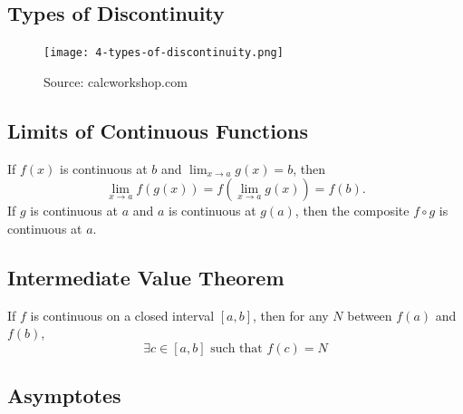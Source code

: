 \documentclass[a4paper,11pt]{article}
\begin{document}


\subsection{Types of Discontinuity}

\begin{figure}[htbp]
    \centering
    \texttt{[image: 4-types-of-discontinuity.png]} 
    \caption{Source: calcworkshop.com}
    \label{fig:discontinuity}
\end{figure}




\subsection{Limits of Continuous Functions}

\begin{tcolorbox}
    If $f(x)$ is continuous at $b$ and $\lim_{x \to a} g(x) = b$,  then
    \[
    \lim_{x \to a} f(g(x)) = f( \lim_{x \to a} g(x) ) = f(b).
    \]
    \tcblower
    If $g$ is continuous at $a$ and $a$ is continuous at $g(a)$, then the composite $f \circ g$ is continuous at $a$.
\end{tcolorbox}




\subsection{Intermediate Value Theorem}

\begin{tcolorbox}
    If $f$ is continuous on a closed interval $[a, b]$, then for any $N$ between $f(a)$ and $f(b)$,  
    \[
    \exists c \in [a,b] \text{ such that } f(c) = N
    \]
\end{tcolorbox}




\subsection{Asymptotes}
\end{document}
